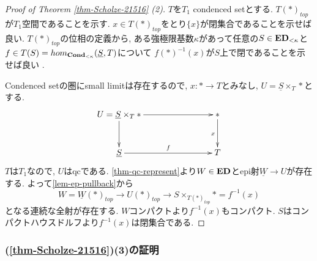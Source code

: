 \documentclass[dvipdfmx,a4paper,11pt]{article}
\theoremstyle{definition}
\begin{document}
\begin{proof}[Proof of Theorem \ref{thm-Scholze-21516} (2)]
$T$を$T_1$ condenced setとする. 
$T(\ast)_{top}$が$T_1$空間であることを示す.
$x \in T(\ast)_{top}$をとり$\{ x\}$が閉集合であることを示せば良い. 
$T(\ast)_{top}$の位相の定義から, ある強極限基数$\kappa$があって任意の$S \in {\bf ED}_{< \kappa}$と$f \in T(S) = hom_{{\bf Cond}_{< \kappa}}(\underline{S}, T)$について
$f(\ast)^{-1}(x)$が$S$上で閉であることを示せば良い .

Condenced setの圏にsmall limitは存在するので, $x : \ast \to T$とみなし, $U = \underline{S} \times_{T} \ast $とする. 
\begin{equation*}
\xymatrix@C=80pt@R=30pt{
U = \underline{S} \times_{T} \ast \ar@{->}[r]
\ar@{->}[d]
& \ast \ar@{->}[d]_{x}
\\
\underline{S} \ar@{->}[r]^{f}
&T
 \\   
}
\end{equation*}
$T$は$T_1$なので, $U$はqcである.
\ref{thm-qc-represent}より$W \in {\bf ED}$とepi射$\underline{W} \to U$が存在する.
よって\ref{lem-ep-pullback}から
$$
W=\underline{W}(\ast)_{top} \to U(\ast)_{top}
\to S \times_{T(\ast)_{top}} \ast = f^{-1}(x)
$$
となる連続な全射が存在する. 
$W$コンパクトより$f^{-1}(x)$もコンパクト. $S$はコンパクトハウスドルフより$f^{-1}(x)$は閉集合である. 
\end{proof}

\subsubsection{\cite[Proposition 2.15, Theorem 2.16]{Sch19}(\ref{thm-Scholze-21516})(3)の証明}
\end{document}
